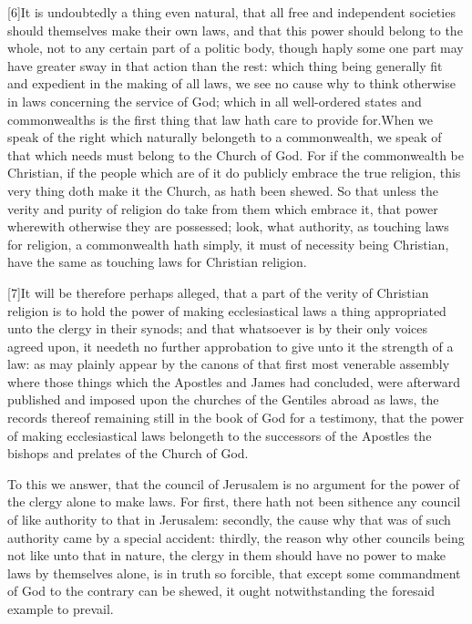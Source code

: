 [6]It is undoubtedly a thing even natural, that all free and independent societies should themselves make their own laws, and that this power should belong to the whole, not to any certain part of a politic body, though haply some one part may have greater sway in that action than the rest: which thing being generally fit and expedient in the making  of all laws, we see no cause why to think otherwise in laws concerning the service of God; which in all well-ordered states and commonwealths is the first thing that law hath care to provide for.When we speak of the right which naturally belongeth to a commonwealth, we speak of that which needs must belong to the Church of God. For if the commonwealth be Christian, if the people which are of it do publicly embrace the true religion, this very thing doth make it the Church, as hath been shewed. So that unless the verity and purity of religion do take from them which embrace it, that power wherewith otherwise they are possessed; look, what authority, as touching laws for religion, a commonwealth hath simply, it must of necessity being Christian, have the same as touching laws for Christian religion.

[7]It will be therefore perhaps alleged, that a part of the verity of Christian religion is to hold the power of making ecclesiastical laws a thing appropriated unto the clergy in their synods; and that whatsoever is by their only voices agreed upon, it needeth no further approbation to give unto it the strength of a law: as may plainly appear by the canons of that first most venerable assembly where those things which the Apostles and James had concluded, were afterward published and imposed upon the churches of the Gentiles abroad as laws, the records thereof remaining still in the book of God for a testimony, that the power of making ecclesiastical laws belongeth to the successors of the Apostles the bishops and prelates of the Church of God.


To this we answer, that the council of Jerusalem is no argument for the power of the clergy alone to make laws. For first, there hath not been sithence any council of like authority to that in Jerusalem: secondly, the cause why that was of such authority came by a special accident: thirdly, the reason why other councils being not like unto that in nature, the clergy in them should have no power to make laws by themselves alone, is in truth so forcible, that except some commandment of God to the contrary can be shewed, it ought notwithstanding the foresaid example to prevail.

